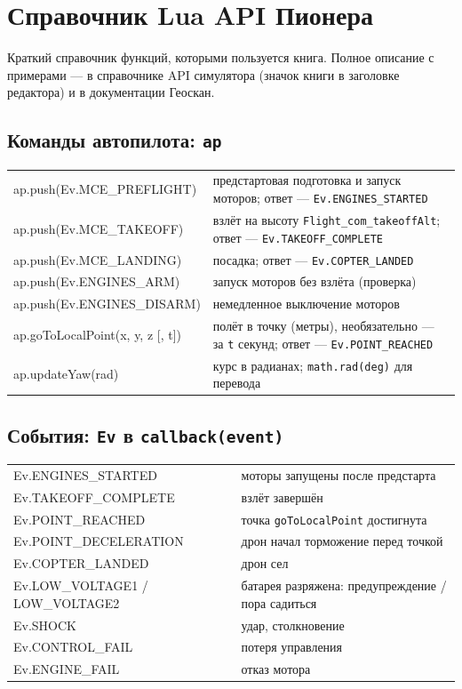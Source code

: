 \section{Справочник Lua API Пионера}
\label{sec:lua-api}

Краткий справочник функций, которыми пользуется книга. Полное описание с примерами --- в справочнике API симулятора (значок книги в заголовке редактора) и в документации Геоскан.

\subsection{Команды автопилота: \texttt{ap}}
\begin{center}\small
\begin{tabularx}{\linewidth}{@{}>{\ttfamily}l X@{}}
\toprule
ap.push(Ev.MCE\_PREFLIGHT) & предстартовая подготовка и запуск моторов; ответ --- \texttt{Ev.ENGINES\_STARTED} \\
ap.push(Ev.MCE\_TAKEOFF) & взлёт на высоту \texttt{Flight\_com\_takeoffAlt}; ответ --- \texttt{Ev.TAKEOFF\_COMPLETE} \\
ap.push(Ev.MCE\_LANDING) & посадка; ответ --- \texttt{Ev.COPTER\_LANDED} \\
ap.push(Ev.ENGINES\_ARM) & запуск моторов без взлёта (проверка) \\
ap.push(Ev.ENGINES\_DISARM) & немедленное выключение моторов \\
ap.goToLocalPoint(x, y, z [, t]) & полёт в точку (метры), необязательно --- за \texttt{t} секунд; ответ --- \texttt{Ev.POINT\_REACHED} \\
ap.updateYaw(rad) & курс в радианах; \texttt{math.rad(deg)} для перевода \\
\bottomrule
\end{tabularx}
\end{center}

\subsection{События: \texttt{Ev} в \texttt{callback(event)}}
\begin{center}\small
\begin{tabularx}{\linewidth}{@{}>{\ttfamily}l X@{}}
\toprule
Ev.ENGINES\_STARTED & моторы запущены после предстарта \\
Ev.TAKEOFF\_COMPLETE & взлёт завершён \\
Ev.POINT\_REACHED & точка \texttt{goToLocalPoint} достигнута \\
Ev.POINT\_DECELERATION & дрон начал торможение перед точкой \\
Ev.COPTER\_LANDED & дрон сел \\
Ev.LOW\_VOLTAGE1 / LOW\_VOLTAGE2 & батарея разряжена: предупреждение / пора садиться \\
Ev.SHOCK & удар, столкновение \\
Ev.CONTROL\_FAIL & потеря управления \\
Ev.ENGINE\_FAIL & отказ мотора \\
\bottomrule
\end{tabularx}
\end{center}

